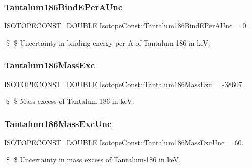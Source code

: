 \subsubsection{\texorpdfstring{Tantalum186\+Bind\+E\+Per\+A\+Unc}{Tantalum186BindEPerAUnc}}
{\footnotesize\ttfamily \mbox{\hyperlink{group___isotope_const-_macros_ga8f45a7272ce02c0b4c65c44636ed719a}{I\+S\+O\+T\+O\+P\+E\+C\+O\+N\+S\+T\+\_\+\+D\+O\+U\+B\+LE}} Isotope\+Const\+::\+Tantalum186\+Bind\+E\+Per\+A\+Unc = 0.}

\$ \$ Uncertainty in binding energy per A of Tantalum-\/186 in keV. \mbox{\label{group___isotope_const-_tantalum-_ta186_ga45af1528825550db2df9a0dfa6a88ef9}} 
\subsubsection{\texorpdfstring{Tantalum186\+Mass\+Exc}{Tantalum186MassExc}}
{\footnotesize\ttfamily \mbox{\hyperlink{group___isotope_const-_macros_ga8f45a7272ce02c0b4c65c44636ed719a}{I\+S\+O\+T\+O\+P\+E\+C\+O\+N\+S\+T\+\_\+\+D\+O\+U\+B\+LE}} Isotope\+Const\+::\+Tantalum186\+Mass\+Exc = -\/38607.}

\$ \$ Mass excess of Tantalum-\/186 in keV. \mbox{\label{group___isotope_const-_tantalum-_ta186_ga2670b336022b087eef66c84778c5a14d}} 
\subsubsection{\texorpdfstring{Tantalum186\+Mass\+Exc\+Unc}{Tantalum186MassExcUnc}}
{\footnotesize\ttfamily \mbox{\hyperlink{group___isotope_const-_macros_ga8f45a7272ce02c0b4c65c44636ed719a}{I\+S\+O\+T\+O\+P\+E\+C\+O\+N\+S\+T\+\_\+\+D\+O\+U\+B\+LE}} Isotope\+Const\+::\+Tantalum186\+Mass\+Exc\+Unc = 60.}

\$ \$ Uncertainty in mass excess of Tantalum-\/186 in keV. \mbox{\label{group___isotope_const-_tantalum-_ta186_ga097eac9a31ec1bc0b96ecb401344ef9b}} 
